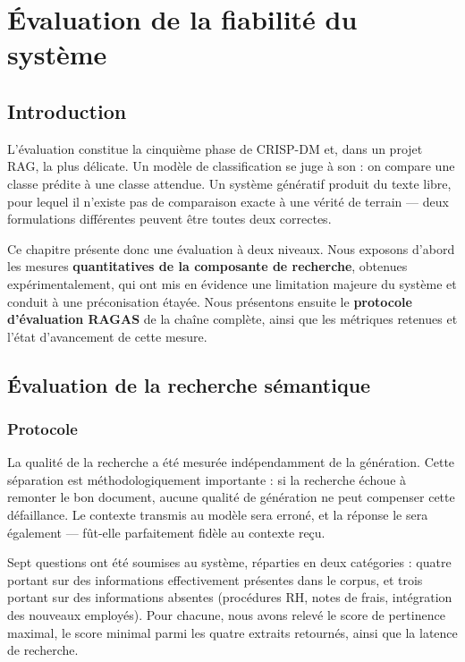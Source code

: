 \chapter{Évaluation de la fiabilité du système}
\label{ch:evaluation}

\section{Introduction}

L'évaluation constitue la cinquième phase de CRISP-DM et, dans un projet RAG,
la plus délicate. Un modèle de classification se juge à son  :
on compare une classe prédite à une classe attendue. Un système génératif produit
du texte libre, pour lequel il n'existe pas de comparaison exacte à une vérité de
terrain --- deux formulations différentes peuvent être toutes deux correctes.

Ce chapitre présente donc une évaluation à deux niveaux. Nous exposons d'abord
les mesures \textbf{quantitatives de la composante de recherche}, obtenues
expérimentalement, qui ont mis en évidence une limitation majeure du système et
conduit à une préconisation étayée. Nous présentons ensuite le
\textbf{protocole d'évaluation RAGAS} de la chaîne complète, ainsi que les
métriques retenues et l'état d'avancement de cette mesure.

\section{Évaluation de la recherche sémantique}

\subsection{Protocole}

La qualité de la recherche a été mesurée indépendamment de la génération. Cette
séparation est méthodologiquement importante : si la recherche échoue à remonter
le bon document, aucune qualité de génération ne peut compenser cette
défaillance. Le contexte transmis au modèle sera erroné, et la réponse le sera
également --- fût-elle parfaitement fidèle au contexte reçu.

Sept questions ont été soumises au système, réparties en deux catégories : quatre
portant sur des informations effectivement présentes dans le corpus, et trois
portant sur des informations absentes (procédures RH, notes de frais,
intégration des nouveaux employés). Pour chacune, nous avons relevé le score de
pertinence maximal, le score minimal parmi les quatre extraits retournés, ainsi
que la latence de recherche.

